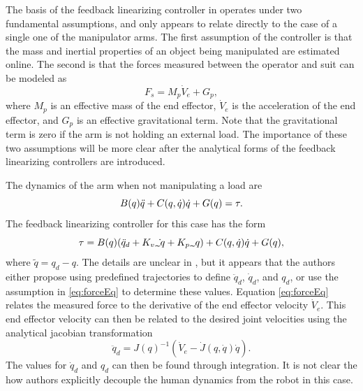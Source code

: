 The basis of the feedback linearizing controller in \cite{} operates under two fundamental assumptions, and only appears to relate directly to the case of a single one of the manipulator arms.  The first assumption of the controller is that the mass and inertial properties of an object being manipulated are estimated online.  The second is that the forces measured between the operator and suit can be modeled as
\begin{equation}
F_s = M_p \dot{V}_e + G_p,
\label{eq:forceEq}
\end{equation}
where $M_p$ is an effective mass of the end effector, $\dot{V}_e$ is the acceleration of the end effector, and $G_p$ is an effective gravitational term.  Note that the gravitational term is zero if the arm is not holding an external load.  The importance of these two assumptions will be more clear after the analytical forms of the feedback linearizing controllers are introduced. 

The dynamics of the arm when not manipulating a load are
\begin{equation}
B(q) \ddot{q} + C(q,\dot{q})\dot{q} + G(q) = \tau. \notag
\end{equation} 
The feedback linearizing controller for this case has the form
\begin{equation}
\tau = B(q)(\ddot{q}_d + K_v \dot{\tilde{q}} + K_p \tilde{q}) + C(q,\dot{q})\dot{q} + G(q), \notag
\end{equation}
where $\tilde{q} = q_d - q$.  The details are unclear in \cite{}, but it appears that the authors either propose using predefined trajectories to define $\ddot{q}_d$, $\dot{q}_d$, and $q_d$, or use the assumption in \eqref{eq:forceEq} to determine these values.  
Equation \ref{eq:forceEq} relates the measured force to the derivative of the end effector velocity $\dot{V}_e$.  This end effector velocity can then be related to the desired joint velocities using the analytical jacobian transformation \[ \ddot{q}_d = J(q)^{-1}(\dot{V}_e - \dot{J}(q,\dot{q})\dot{q}).\]  The values for $\dot{q}_d$ and $q_d$ can then be found through integration.  It is not clear the how authors explicitly decouple the human dynamics from the robot in this case.

